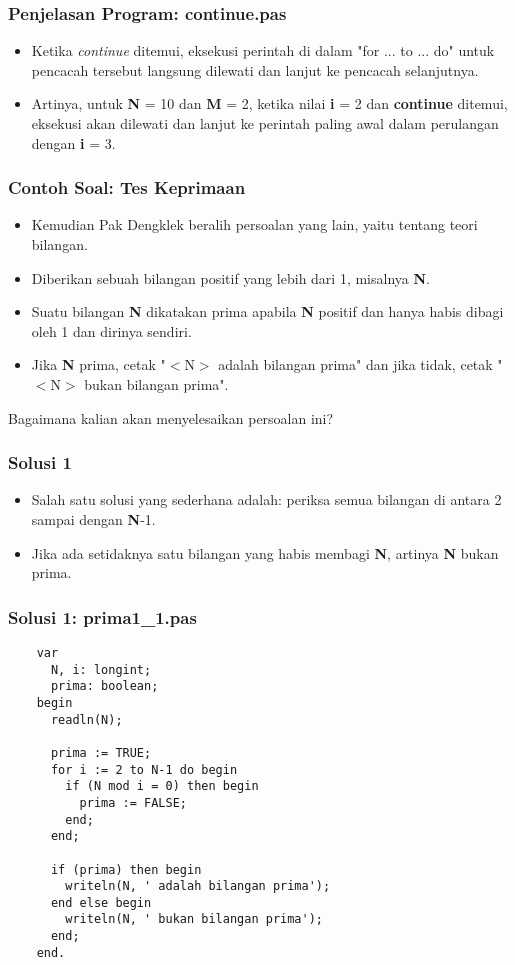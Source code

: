\begin{frame}
\frametitle{Penjelasan Program: continue.pas}
\begin{itemize}
  \item Ketika \textit{continue} ditemui, eksekusi perintah di dalam "for ... to ... do" untuk pencacah tersebut langsung dilewati dan lanjut ke pencacah selanjutnya.
  \item Artinya, untuk \textbf{N} = 10 dan \textbf{M} = 2, ketika nilai \textbf{i} = 2 dan \textbf{continue} ditemui, eksekusi akan dilewati dan lanjut ke perintah paling awal dalam perulangan dengan \textbf{i} = 3.
\end{itemize}
\end{frame}


\begin{frame}
\frametitle{Contoh Soal: Tes Keprimaan}
\begin{itemize}
  \item Kemudian Pak Dengklek beralih persoalan yang lain, yaitu tentang teori bilangan.
  \item Diberikan sebuah bilangan positif yang lebih dari 1, misalnya \textbf{N}.
  \item Suatu bilangan \textbf{N} dikatakan prima apabila \textbf{N} positif dan hanya habis dibagi oleh 1 dan dirinya sendiri.
  \item Jika \textbf{N} prima, cetak "$<$N$>$ adalah bilangan prima" dan jika tidak, cetak "$<$N$>$ bukan bilangan prima".
\end{itemize}
Bagaimana kalian akan menyelesaikan persoalan ini?
\end{frame}

\begin{frame}
\frametitle{Solusi 1}
\begin{itemize}
  \item Salah satu solusi yang sederhana adalah: periksa semua bilangan di antara 2 sampai dengan \textbf{N}-1.
  \item Jika ada setidaknya satu bilangan yang habis membagi \textbf{N}, artinya \textbf{N} bukan prima.
\end{itemize}
\end{frame}


\begin{frame}[fragile]
\frametitle{Solusi 1: prima1\_1.pas}
  \begin{lstlisting}
    var
      N, i: longint;
      prima: boolean;
    begin
      readln(N);

      prima := TRUE;
      for i := 2 to N-1 do begin
        if (N mod i = 0) then begin
          prima := FALSE;
        end;
      end;

      if (prima) then begin
        writeln(N, ' adalah bilangan prima');
      end else begin
        writeln(N, ' bukan bilangan prima');
      end;
    end.
  \end{lstlisting}
\end{frame}

